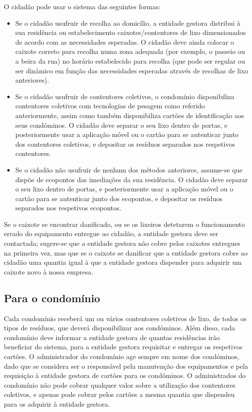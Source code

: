 \documentclass[11pt, a4paper, oneside]{book}
\begin{document}
O cidadão pode usar o sistema das seguintes formas:

\begin{itemize}
    \item Se o cidadão usufruir de recolha ao domicílio, a entidade gestora distribui à sua residência ou estabelecimento caixotes/contentores de lixo dimensionados de acordo com as necessidades esperadas. O cidadão deve ainda colocar o caixote correto para recolha numa zona adequada (por exemplo, o passeio ou a beira da rua) no horário estabelecido para recolha (que pode ser regular ou ser dinâmico em função das necessidades esperadas através de recolhas de lixo anteriores).
    \item Se o cidadão usufruir de contentores coletivos, o condomínio disponibiliza contentores coletivos com tecnologias de pesagem como referido anteriormente, assim como também disponibiliza cartões de identificação aos seus condóminos. O cidadão deve separar o seu lixo dentro de portas, e posteriormente usar a aplicação móvel ou o cartão para se autenticar junto dos contentores coletivos, e depositar os resíduos separados nos respetivos contentores.
    \item Se o cidadão não usufruir de nenhum dos métodos anteriores, assume-se que dispõe de ecopontos das imediações da sua residência. O cidadão deve separar o seu lixo dentro de portas, e posteriormente usar a aplicação móvel ou o cartão para se autenticar junto dos ecopontos, e depositar os resíduos separados nos respetivos ecopontos.
\end{itemize}

Se o caixote se encontrar danificado, ou se os lixeiros detetarem o funcionamento errado do equipamento entregue ao cidadão, a entidade gestora deve ser contactada; sugere-se que a entidade gestora não cobre pelos caixotes entregues na primeira vez, mas que se o caixote se danificar que a entidade gestora cobre ao cidadão uma quantia igual à que a entidade gestora dispender para adquirir um caixote novo à nossa empresa.

\subsection{Para o condomínio}

Cada condomínio receberá um ou vários contentores coletivos de lixo, de todos os tipos de resíduos, que deverá disponibilizar aos condóminos. Além disso, cada condomínio deve informar a entidade gestora de quantas residências irão beneficiar do sistema, para a entidade gestora requisitar e entregar os respetivos cartões. O administrador do condomínio age sempre em nome dos condóminos, dado que se considera ser o responsável pela manutenção dos equipamentos e pela requisição à entidade gestora de cartões para os condóminos. O administrados do condomínio não pode cobrar qualquer valor sobre a utilização dos contentores coletivos, e apenas pode cobrar pelos cartões a mesma quantia que dispendeu para os adquirir à entidade gestora.
\end{document}
